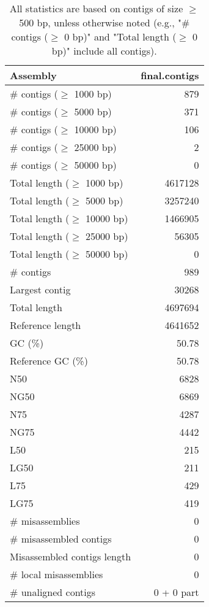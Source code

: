 \documentclass[12pt,a4paper]{article}
\begin{document}
\begin{table}[ht]
\begin{center}
\caption{All statistics are based on contigs of size $\geq$ 500 bp, unless otherwise noted (e.g., "\# contigs ($\geq$ 0 bp)" and "Total length ($\geq$ 0 bp)" include all contigs).}
\begin{tabular}{|l*{1}{|r}|}
\hline
Assembly & final.contigs \\ \hline
\# contigs ($\geq$ 1000 bp) & 879 \\ \hline
\# contigs ($\geq$ 5000 bp) & 371 \\ \hline
\# contigs ($\geq$ 10000 bp) & 106 \\ \hline
\# contigs ($\geq$ 25000 bp) & 2 \\ \hline
\# contigs ($\geq$ 50000 bp) & 0 \\ \hline
Total length ($\geq$ 1000 bp) & 4617128 \\ \hline
Total length ($\geq$ 5000 bp) & 3257240 \\ \hline
Total length ($\geq$ 10000 bp) & 1466905 \\ \hline
Total length ($\geq$ 25000 bp) & 56305 \\ \hline
Total length ($\geq$ 50000 bp) & 0 \\ \hline
\# contigs & 989 \\ \hline
Largest contig & 30268 \\ \hline
Total length & 4697694 \\ \hline
Reference length & 4641652 \\ \hline
GC (\%) & 50.78 \\ \hline
Reference GC (\%) & 50.78 \\ \hline
N50 & 6828 \\ \hline
NG50 & 6869 \\ \hline
N75 & 4287 \\ \hline
NG75 & 4442 \\ \hline
L50 & 215 \\ \hline
LG50 & 211 \\ \hline
L75 & 429 \\ \hline
LG75 & 419 \\ \hline
\# misassemblies & 0 \\ \hline
\# misassembled contigs & 0 \\ \hline
Misassembled contigs length & 0 \\ \hline
\# local misassemblies & 0 \\ \hline
\# unaligned contigs & 0 + 0 part \\ \hline

\end{tabular}
\end{center}
\end{table}
\end{document}
